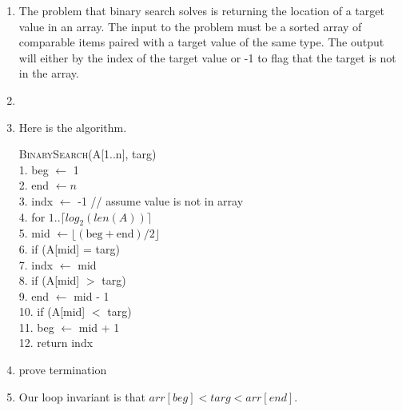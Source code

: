 \documentclass{article}
\begin{document}

\begin{enumerate}
    \item The problem that binary search solves is returning the location of a target value in an array.
    The input to the problem must be a sorted array of comparable items paired with a target value of the same type.
    The output will either by the index of the target value or -1 to flag that the target is not in the array.
    \item
    \item Here is the algorithm.
    \begin{algorithm}
    	\textsc{BinarySearch}(A[1..n], targ) \\
    	1.  \hspace{0em}   beg $\leftarrow$ 1 \\
    	2.  \hspace{0em}   end $\leftarrow n$ \\
        3.  \hspace{0em}   indx $\leftarrow$ -1 // assume value is not in array \\
    	4.  \hspace{0em}   for $1.. \lceil log_2(len(A)) \rceil$ \\
    	5.  \hspace{2em}       mid $\leftarrow \lfloor (\text{beg}+\text{end})/2 \rfloor$ \\
    	6.  \hspace{2em}	   if (A[mid] = targ) \\
    	7.  \hspace{4em}	       indx $\leftarrow$ mid \\
    	8.  \hspace{2em}	   if (A[mid] $>$ targ) \\
    	9.  \hspace{4em}		   end $\leftarrow$ mid - 1 \\
    	10. \hspace{1.5em}	   if (A[mid] $<$ targ) \\
        11. \hspace{3.5em}        beg $\leftarrow$ mid + 1 \\
        12. return indx
    \end{algorithm}
    \item prove termination
    \item Our loop invariant is that $arr[beg] < targ < arr[end]$.

\end{enumerate}
\end{document}
